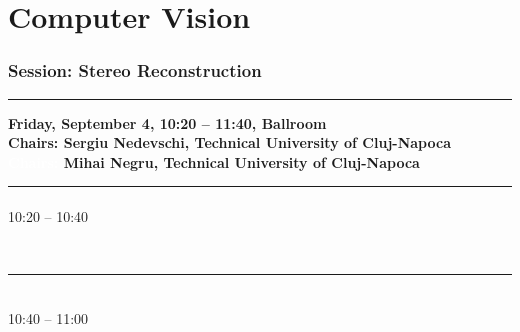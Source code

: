\part{Computer Vision}


\section{{\bf \large Session: %
Stereo Reconstruction
}} \vspace{-15pt} %
\noindent\rule{\textwidth}{0.4pt} \nopagebreak
{\bf  
Friday, September 4, 10:20 -- 11:40, Ballroom
} \\ \nopagebreak
{\bf  Chairs: 
Sergiu Nedevschi, Technical University of Cluj-Napoca
} \\ \nopagebreak 
{\bf  \textcolor{white}{Chairs:} 
Mihai Negru, Technical University of Cluj-Napoca
} \\ \nopagebreak 
\noindent\rule{\textwidth}{0.4pt} \nopagebreak

\vspace*{-36pt}\subsection[ 
    	   {\bf A review and evaluation of penalty functions for Semi-Global Matching
           } \\
           {\it Christos Stentoumis, Elli Karkalou, George Karras
           }
	]
	    {
            }
	    10:20 -- 10:40 \nopagebreak

            
            \\ 
            \noindent\rule{\textwidth}{0.4pt}

$ $\\
\vspace*{-36pt}\subsection[ 
    	   {\bf New Sub-Pixel Interpolation Functions for Accurate Real-Time Stereo-Matching Algorithms
           } \\
           {\it Vlad Miclea, Cristian Cosmin Vancea, Sergiu Nedevschi
           }
	]
	    {
            }
	    10:40 -- 11:00 \nopagebreak


